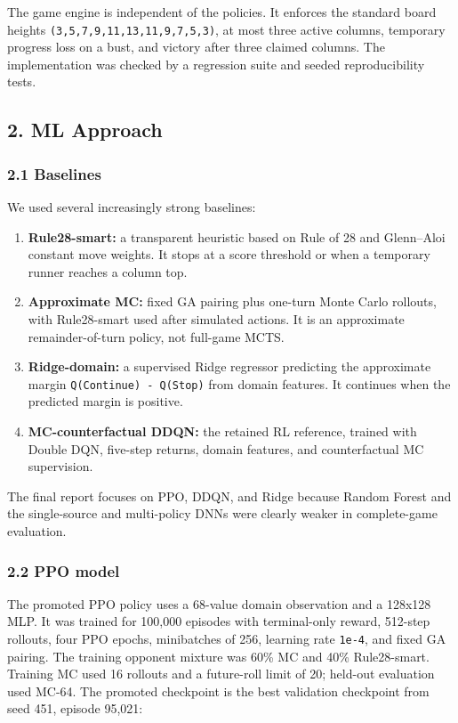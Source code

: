 \documentclass[
  11pt,
]{article}
\providecommand{\tightlist}{%
  \setlength{\itemsep}{0pt}\setlength{\parskip}{0pt}}
\begin{document}
The game engine is independent of the policies. It enforces the standard
board heights \texttt{(3,5,7,9,11,13,11,9,7,5,3)}, at most three active
columns, temporary progress loss on a bust, and victory after three
claimed columns. The implementation was checked by a regression suite
and seeded reproducibility tests.

\subsection{2. ML Approach}\label{2-ml-approach}

\subsubsection{2.1 Baselines}\label{21-baselines}

We used several increasingly strong baselines:

\begin{enumerate}
\def\labelenumi{\arabic{enumi}.}
\tightlist
\item
  \textbf{Rule28-smart:} a transparent heuristic based on Rule of 28 and
  Glenn--Aloi constant move weights. It stops at a score threshold or
  when a temporary runner reaches a column top.
\item
  \textbf{Approximate MC:} fixed GA pairing plus one-turn Monte Carlo
  rollouts, with Rule28-smart used after simulated actions. It is an
  approximate remainder-of-turn policy, not full-game MCTS.
\item
  \textbf{Ridge-domain:} a supervised Ridge regressor predicting the
  approximate margin \texttt{Q(Continue)\ -\ Q(Stop)} from domain
  features. It continues when the predicted margin is positive.
\item
  \textbf{MC-counterfactual DDQN:} the retained RL reference, trained
  with Double DQN, five-step returns, domain features, and
  counterfactual MC supervision.
\end{enumerate}

The final report focuses on PPO, DDQN, and Ridge because Random Forest
and the single-source and multi-policy DNNs were clearly weaker in
complete-game evaluation.

\subsubsection{2.2 PPO model}\label{22-ppo-model}

The promoted PPO policy uses a 68-value domain observation and a 128x128
MLP. It was trained for 100,000 episodes with terminal-only reward,
512-step rollouts, four PPO epochs, minibatches of 256, learning rate
\texttt{1e-4}, and fixed GA pairing. The training opponent mixture was
60\% MC and 40\% Rule28-smart. Training MC used 16 rollouts and a
future-roll limit of 20; held-out evaluation used MC-64. The promoted
checkpoint is the best validation checkpoint from seed 451, episode
95,021:
\end{document}

